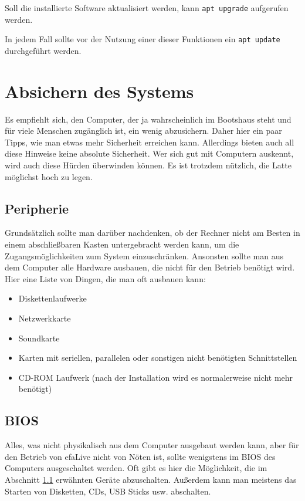 \documentclass[a4paper,12pt,twoside]{article}
\begin{document}
Soll die installierte Software aktualisiert werden, kann
\texttt{apt upgrade} aufgerufen werden.

In jedem Fall sollte vor der Nutzung einer dieser Funktionen ein
\texttt{apt update} durchgeführt werden.


\section{Absichern des Systems}
\label{sct:system_absichern}
Es empfiehlt sich, den Computer, der
ja wahrscheinlich im Bootshaus steht und für viele Menschen
zugänglich ist, ein wenig abzusichern. Daher hier ein paar Tipps, wie
man etwas mehr Sicherheit erreichen kann. Allerdings bieten auch all
diese Hinweise keine absolute Sicherheit. Wer sich gut mit Computern
auskennt, wird auch diese Hürden überwinden können. Es ist trotzdem
nützlich, die Latte möglichst hoch zu legen.


\subsection{Peripherie}
\label{sct:peripherie}
Grundsätzlich sollte man darüber nachdenken, ob der Rechner nicht am
Besten in einem abschließbaren Kasten untergebracht werden kann, um die 
Zugangsmöglichkeiten zum System einzuschränken. Ansonsten sollte man 
aus dem Computer alle Hardware ausbauen, die
nicht für den Betrieb benötigt wird. Hier eine Liste von Dingen, die
man oft ausbauen kann:

\begin{itemize}
    \item Diskettenlaufwerke
    \item Netzwerkkarte
    \item Soundkarte
    \item Karten mit seriellen, parallelen oder sonstigen nicht benötigten
        Schnittstellen
    \item CD-ROM Laufwerk (nach der Installation wird es normalerweise nicht
        mehr benötigt)
\end{itemize}


\subsection{BIOS}
\label{sct:bios}
Alles, was nicht physikalisch aus dem Computer ausgebaut werden kann,
aber für den Betrieb von efaLive nicht von Nöten ist, sollte wenigstens
im BIOS des Computers ausgeschaltet werden. Oft gibt es hier die
Möglichkeit, die im Abschnitt \ref{sct:peripherie} erwähnten Geräte abzuschalten.
Außerdem kann man meistens das Starten von Disketten, CDs, USB Sticks
usw. abschalten.
\end{document}
